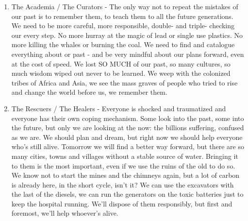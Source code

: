 \begin{enumerate}
\item The Academia / The Curators - The only way not to repeat the mistakes of our past is to remember them, to teach them to all the future generations. We need to be more careful, more responsible, double- and triple- checking our every step. No more hurray at the magic of lead or single use plastics. No more killing the whales or burning the coal. We need to find and catalogue everything about or past - and be very mindful about our plans forward, even at the cost of speed. We lost SO MUCH of our past, so many cultures, so much wisdom wiped out never to be learned. We weep with the colonized tribes of Africa and Asia, we see the mass graves of people who tried to rise and change the world before us, we remember them.

\item The Rescuers / The Healers - Everyone is shocked and traumatized and everyone has their own coping mechanism. Some look into the past, some into the future, but only we are looking at the now: the billions suffering, confused as we are. We should plan and dream, but right now we should help everyone who's still alive. Tomorrow we will find a better way forward, but there are so many cities, towns and villages without a stable source of water. Bringing it to them is the most important, even if we use the ruins of the old to do so. We know not to start the mines and the chimneys again, but a lot of carbon is already here, in the short cycle, isn't it? We can use the excavators with the last of the diesels, we can run the generators on the toxic batteries just to keep the hospital running. We'll dispose of them responsibly, but first and foremost, we'll help whoever's alive.

\end{enumerate}